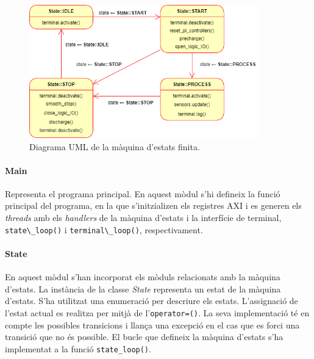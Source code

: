 {{        \begin{figure}[!htb]
            \centering
            \captionsetup{justification=centering, margin=1cm}
            \includegraphics[width=10cm]
                { img/4_implementacio/state_machine.png }
            \caption{ Diagrama UML de la màquina d'estats finita.
             }
            \label{fms_uml}
        \end{figure}

        \paragraph{Main}
        {
            Representa el programa principal. En aquest mòdul s'hi defineix la
            funció principal del programa, en la que s'initzializen els
            registres AXI i es generen els \emph{threads} amb els
            \emph{handlers} de la màquina d'estats i la interfície de terminal,
            \lstinline{state\_loop()} i \lstinline{terminal\_loop()},
            respectivament.
        }
        
        \paragraph{State}
        { 
            En aquest mòdul s'han incorporat els mòduls relacionats amb la
            màquina d'estats. La instància de la classe \emph{State} representa
            un estat de la màquina d'estats. S'ha utilitzat una enumeració per
            descriure els estats. L'assignació de l'estat actual es realitza
            per mitjà de l'\lstinline{operator=()}. La seva implementació té en
            compte les possibles transicions i llança una excepció en el cas
            que es forci una transició que no és possible. El bucle que
            defineix la màquina d'estats s'ha implementat a la funció
            \lstinline{state_loop()}.

}}}
